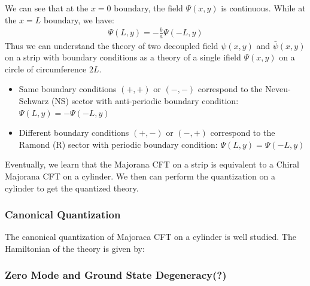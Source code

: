 We can see that at the $ x= 0 $ boundary, the field $ \Psi(x,y) $ is continuous. While at the $ x=L $ boundary, we have:
\begin{align}
  \Psi(L,y)=-\frac{b}{a}\Psi(-L,y)
\end{align}
Thus we can understand the theory of two decoupled field $ \psi(x,y) $ and $ \bar{\psi}(x,y) $ on a strip with boundary conditions as a theory of a single ifield $ \Psi(x,y) $ on a circle of circumference $ 2L $. 
\begin{itemize}
  \item Same boundary conditions $ (+,+) $ or $ (-,-) $ correspond to the Neveu-Schwarz (NS) sector with anti-periodic boundary condition: $ \Psi(L,y)=-\Psi(-L,y) $ 
  \item Different boundary conditions $ (+,-) $ or $ (-,+) $ correspond to the Ramond (R) sector with periodic boundary condition: $ \Psi(L,y)=\Psi(-L,y) $
\end{itemize}

Eventually, we learn that the Majorana CFT on a strip is equivalent to a Chiral Majorana CFT on a cylinder. We then can perform the quantization on a cylinder to get the quantized theory.

\subsubsection{Canonical Quantization}

The canonical quantization of Majoraca CFT on a cylinder is well studied. The Hamiltonian of the theory is given by:

\subsubsection{Zero Mode and Ground State Degeneracy(?)}


